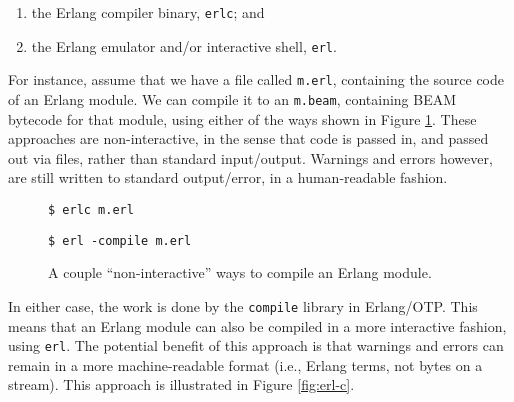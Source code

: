 \begin{enumerate}

\item the Erlang compiler binary, \texttt{erlc}; and

\item the Erlang emulator and/or interactive shell, \texttt{erl}.

\end{enumerate}

For instance, assume that we have a file called \texttt{m.erl},
containing the source code of an Erlang module. We can compile it to
an \texttt{m.beam}, containing BEAM bytecode for that module, using
either of the ways shown in Figure \ref{fig:erlc}. These approaches
are non-interactive, in the sense that code is passed in, and passed
out via files, rather than standard input/output. Warnings and errors
however, are still written to standard output/error, in a
human-readable fashion.

\begin{figure}[h!]
\begin{minipage}[t]{0.5\textwidth}
\begin{lstlisting}
$ erlc m.erl
\end{lstlisting}
\end{minipage}%
\begin{minipage}[t]{0.5\textwidth}
\begin{lstlisting}
$ erl -compile m.erl
\end{lstlisting}
\end{minipage}%
\caption{A couple ``non-interactive'' ways to compile an Erlang
module.}
\label{fig:erlc}
\end{figure}

In either case, the work is done by the \texttt{compile} library in
Erlang/OTP. This means that an Erlang module can also be compiled in a
more interactive fashion, using \texttt{erl}. The potential benefit of
this approach is that warnings and errors can remain in a more
machine-readable format (i.e., Erlang terms, not bytes on a stream).
This approach is illustrated in Figure \ref{fig:erl-c}.

